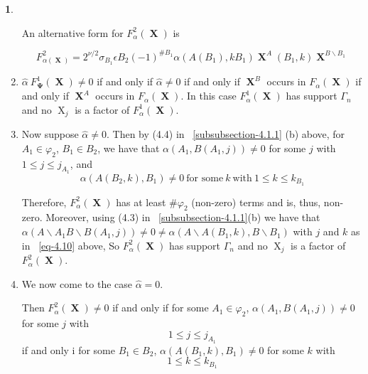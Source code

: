 \documentclass[a4paper,12pt]{article}
\DeclareMathOperator{\x}{\mathrm{X}}
\theoremstyle{definition}
\theoremstyle{underlinethm}
\theoremstyle{definition}
\newtheorem{subsubsec}{}[subsection]
\begin{document}
\begin{subsubsec}
\begin{enumerate}[label=(\alph*)]
An alternative form for $F_{\alpha}^{2} (\boldsymbol{\x})$ is 


\begin{equation}
F^{2}_{\alpha(\boldsymbol{\x})} = 2^{\nu/2} \sigma_{B_{1}} \epsilon B_{2} (-1)^{\# B_{1}} \alpha(A(B_{1}), k B_{1}) \boldsymbol{\x}^{A} (B_{1}, k) \boldsymbol{\x}^{B \smallsetminus B_{1}}\tag{4.9}\label{eq-4.9} 
\end{equation}


\item $\hat{\alpha}~ F_{\boldsymbol{\Psi}}^{1} (\boldsymbol{\x}) \neq 0$ if and only if $\hat{\alpha} \neq 0$ if and only if $\boldsymbol{\x}^{B}$ occurs in $F_{\alpha}(\boldsymbol{\x})$ if and only if $\boldsymbol{\x}^{A}$ occurs in $F_{\alpha}(\boldsymbol{\x})$. In this case $F_{\alpha}^{1}(\boldsymbol{\x})$ has support $\Gamma_{n}$ and no $\x_{j}$ is a factor of $F_{\alpha}^{1}(\boldsymbol{\x})$.


\item Now suppose $\hat{\alpha} \neq 0$. Then by (4.4) in ~\eqref{subsubsection-4.1.1} (b) above, for $A_{1} \in \varphi_{2}$, $B_{1} \in B_{2}$, we have that $\alpha(A_{1}, B(A_{1}, j)) \neq 0$ for some $j$ with $1 \leq j \leq j_{A_{1}}$, and 
\begin{equation}
\alpha {(A(B_{2}, k), B_{1})} \neq 0~\text{for some}~k~\text{with}~ 1 \leq k \leq k_{B_{1}}\tag{4.10}\label{eq-4.10} 
\end{equation}

Therefore, $F_{\alpha}^{2}(\boldsymbol{\x})$ has at least $\# \varphi_{2}$ (non-zero) terms and is, thus, non-zero. Moreover, using (4.3) in ~\eqref{subsubsection-4.1.1}(b) we have that $\alpha\left(A \smallsetminus A_{1} B\smallsetminus B (A_{1}, j) \right) \neq 0 \neq \alpha \left(A\smallsetminus A (B_{1}, k), B \smallsetminus B_{1} \right)$ with $j$ and $k$ as in ~\eqref{eq-4.10} above, So $F_{\alpha}^{2}(\boldsymbol{\x})$ has support $\Gamma_{n}$ and no $\x_{j}$ is a factor of $F_{\alpha}^{2}(\boldsymbol{\x})$.

\item We now come to the case $\hat{\alpha}=0$.

Then $F_{\alpha}^{2} (\boldsymbol{\x}) \neq 0$ if and only if for some $A_{1} \in \varphi_{2}$, $\alpha\left(A_{1}, B(A_{1}, j)\right)\neq 0$ for some $j$ with
\begin{equation}
1 \leq j \leq j_{A_{1}}\tag{4.11}\label{eq-4.11}
\end{equation}
if and only i for some $B_{1} \in B_{2}$, $\alpha\left(A(B_{1}, k), B_{1}\right)  \neq 0 $ for some $k$ with
\begin{equation}
1 \leq k \leq k_{B_{1}}\tag{4.12}\label{eq-4.12}
\end{equation}


\end{enumerate}
\end{subsubsec}
\end{document}
